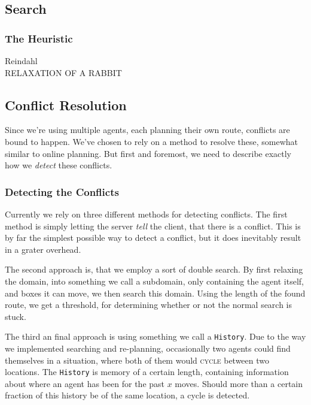 \documentclass[letterpaper]{article}
\begin{document}
				
	\subsection{Search}
		\subsubsection{The Heuristic}
			Reindahl \\
			RELAXATION OF A RABBIT


	\subsection{Conflict Resolution}
		Since we're using multiple agents, each planning their own route, conflicts are bound to happen. We've chosen to rely on a method to resolve these, somewhat similar to online planning. But first and foremost, we need to describe exactly how we \emph{detect} these conflicts.

		\subsubsection{Detecting the Conflicts}
			Currently we rely on three different methods for detecting conflicts. The first method is simply letting the server \emph{tell} the client, that there is a conflict. This is by far the simplest possible way to detect a conflict, but it does inevitably result in a grater overhead. 

			The second approach is, that we employ a sort of double search. By first relaxing the domain, into something we call a subdomain, only containing the agent itself, and boxes it can move, we then search this domain. Using the length of the found route, we get a threshold, for determining whether or not the normal search is stuck.



			The third an final approach is using something we call a \verb=History=. Due to the way we implemented searching and re-planning, occasionally two agents could find themselves in a situation, where both of them would \textsc{cycle} between two locations. The \verb=History= is memory of a certain length, containing information about where an agent has been for the past $x$ moves. Should more than a certain fraction of this history be of the same location, a cycle is detected.
\end{document}
